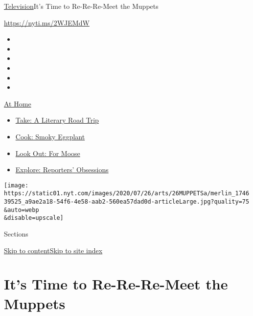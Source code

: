 \href{/section/arts/television}{Television}\textbar{}It's Time to
Re-Re-Re-Meet the Muppets

\url{https://nyti.ms/2WJEMdW}

\begin{itemize}
\item
\item
\item
\item
\item
\item
\end{itemize}

\href{https://www.nytimes.com/spotlight/at-home?action=click\&pgtype=Article\&state=default\&region=TOP_BANNER\&context=at_home_menu}{At
Home}

\begin{itemize}
\tightlist
\item
  \href{https://www.nytimes.com/2020/07/28/books/time-for-a-literary-road-trip.html?action=click\&pgtype=Article\&state=default\&region=TOP_BANNER\&context=at_home_menu}{Take:
  A Literary Road Trip}
\item
  \href{https://www.nytimes.com/2020/07/29/magazine/bored-with-your-home-cooking-some-smoky-eggplant-will-fix-that.html?action=click\&pgtype=Article\&state=default\&region=TOP_BANNER\&context=at_home_menu}{Cook:
  Smoky Eggplant}
\item
  \href{https://www.nytimes.com/2020/07/27/travel/moose-michigan-isle-royale.html?action=click\&pgtype=Article\&state=default\&region=TOP_BANNER\&context=at_home_menu}{Look
  Out: For Moose}
\item
  \href{https://www.nytimes.com/interactive/2020/at-home/even-more-reporters-editors-diaries-lists-recommendations.html?action=click\&pgtype=Article\&state=default\&region=TOP_BANNER\&context=at_home_menu}{Explore:
  Reporters' Obsessions}
\end{itemize}

\texttt{[image: https://static01.nyt.com/images/2020/07/26/arts/26MUPPETSa/merlin\_174639525\_a9ae2a18-54f6-4e58-aab2-560ea57dad0d-articleLarge.jpg?quality=75\\\&auto=webp\\\&disable=upscale]}

Sections

\protect\hyperlink{site-content}{Skip to
content}\protect\hyperlink{site-index}{Skip to site index}

\hypertarget{its-time-to-re-re-re-meet-the-muppets}{%
\section{It's Time to Re-Re-Re-Meet the
Muppets}\label{its-time-to-re-re-re-meet-the-muppets}}


